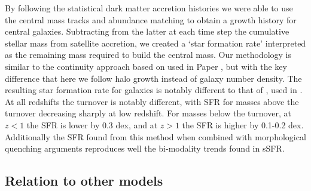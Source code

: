 By following the statistical dark matter accretion histories we were able to use the central mass tracks and abundance matching to obtain a growth history for central galaxies. Subtracting from the latter at each time step the cumulative stellar mass from satellite accretion, we created a `star formation rate' interpreted as the remaining mass required to build the central mass. Our methodology is similar to the continuity approach based on \citet{Leja2015ReconcilingFunction} used in Paper , but with the key difference that here we follow halo growth instead of galaxy number density. 
The resulting star formation rate for galaxies is notably different to that of \citet{Tomczak2014GalaxyGalaxies}, used in \citet{Grylls2019PredictingSteel.}. At all redshifts the turnover is notably different, with SFR for masses above the turnover decreasing sharply at low redshift. For masses below the turnover, at $z < 1$ the SFR is lower by 0.3 dex, and at $z > 1$ the SFR is higher by 0.1-0.2 dex. Additionally the SFR found from this method when combined with morphological quenching arguments reproduces well the bi-modality trends found in sSFR.

\subsection{Relation to other models}

